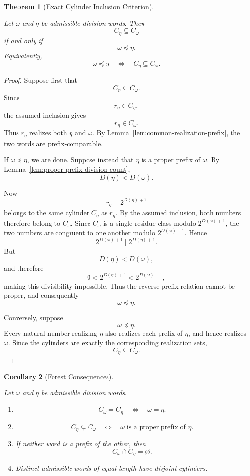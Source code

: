 \documentclass[12pt, oneside]{article}
\numberwithin{equation}{section}
\theoremstyle{definition}
\theoremstyle{plain}
\newtheorem{theorem}{Theorem}[section]
\newtheorem{corollary}[theorem]{Corollary}
\theoremstyle{remark}
\begin{document}
\begin{theorem}[Exact Cylinder Inclusion Criterion]
\label{thm:cylinder-inclusion}

Let \(\omega\) and \(\eta\) be admissible division words. Then
\[
C_\eta\subseteq C_\omega
\]
if and only if
\[
\omega\preceq\eta.
\]
Equivalently,
\[
\boxed{
\omega\preceq\eta
\quad\Longleftrightarrow\quad
C_\eta\subseteq C_\omega.
}
\]
\end{theorem}

\begin{proof}
Suppose first that
\[
C_\eta\subseteq C_\omega.
\]
Since
\[
r_\eta\in C_\eta,
\]
the assumed inclusion gives
\[
r_\eta\in C_\omega.
\]
Thus \(r_\eta\) realizes both \(\eta\) and \(\omega\). By
Lemma~\ref{lem:common-realization-prefix}, the two words are
prefix-comparable.

If \(\omega\preceq\eta\), we are done. Suppose instead that \(\eta\) is a
proper prefix of \(\omega\). By
Lemma~\ref{lem:proper-prefix-division-count},
\[
D(\eta)<D(\omega).
\]

Now
\[
r_\eta+2^{D(\eta)+1}
\]
belongs to the same cylinder \(C_\eta\) as \(r_\eta\). By the assumed
inclusion, both numbers therefore belong to \(C_\omega\). Since
\(C_\omega\) is a single residue class modulo \(2^{D(\omega)+1}\), the two
numbers are congruent to one another modulo \(2^{D(\omega)+1}\). Hence
\[
2^{D(\omega)+1}
\mid
2^{D(\eta)+1}.
\]
But
\[
D(\eta)<D(\omega),
\]
and therefore
\[
0<2^{D(\eta)+1}<2^{D(\omega)+1},
\]
making this divisibility impossible. Thus the reverse prefix relation
cannot be proper, and consequently
\[
\omega\preceq\eta.
\]

Conversely, suppose
\[
\omega\preceq\eta.
\]
Every natural number realizing \(\eta\) also realizes each prefix of
\(\eta\), and hence realizes \(\omega\). Since the cylinders are exactly
the corresponding realization sets,
\[
C_\eta\subseteq C_\omega.
\]
\end{proof}

\begin{corollary}[Forest Consequences]
\label{cor:cylinder-forest-consequences}

Let \(\omega\) and \(\eta\) be admissible division words.

\begin{enumerate}
\item
\[
C_\omega=C_\eta
\quad\Longleftrightarrow\quad
\omega=\eta.
\]

\item
\[
C_\eta\subsetneq C_\omega
\quad\Longleftrightarrow\quad
\omega\text{ is a proper prefix of }\eta.
\]

\item If neither word is a prefix of the other, then
\[
C_\omega\cap C_\eta=\varnothing.
\]

\item Distinct admissible words of equal length have disjoint cylinders.
\end{enumerate}
\end{corollary}
\end{document}
